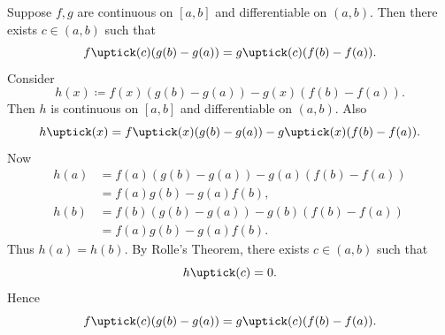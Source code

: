 

\begin{theorem}{
    Suppose $f,g$ are continuous on $[a,b]$ and differentiable on $(a,b)$.
    Then there exists $c\in(a,b)$ such that
    \[
        f\uptick(c)(g(b) - g(a)) = g\uptick(c)(f(b) - f(a)).
    \]
}
	Consider
    \[
        h(x) \coloneqq f(x)(g(b)-g(a)) - g(x)(f(b)-f(a)).
    \]
    Then $h$ is continuous on $[a,b]$ and differentiable on $(a,b)$.
    Also
    \[
        h\uptick(x) = f\uptick(x)(g(b)-g(a)) - g\uptick(x)(f(b)-f(a)).
    \]
    Now
    \begin{align*}
        h(a) &= f(a)(g(b)-g(a)) - g(a)(f(b)-f(a))\\
        &= f(a)g(b) - g(a)f(b),\\
        h(b) &= f(b)(g(b)-g(a)) - g(b)(f(b)-f(a))\\
        &= f(a)g(b) - g(a)f(b).
    \end{align*}
    Thus $h(a)=h(b)$.
    By Rolle's Theorem, there exists $c\in(a,b)$ such that
    \[
        h\uptick(c) = 0.
    \]
    Hence
    \[
        f\uptick(c)(g(b) - g(a)) = g\uptick(c)(f(b) - f(a)).
    \]
\end{theorem}

